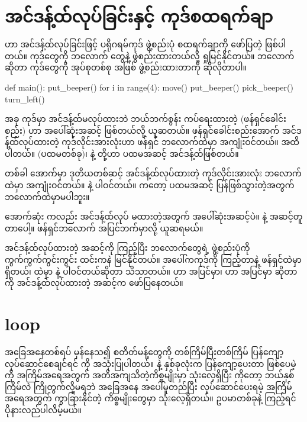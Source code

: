 \section{အင်ဒန့်ထ်လုပ်ခြင်းနှင့် ကုဒ်စထရက်ချာ}

 ဟာ အင်ဒန့်ထ်လုပ်ခြင်းဖြင့် ပရိုဂရမ်ကုဒ် ဖွဲ့စည်းပုံ စထရက်ချာကို ဖော်ပြတဲ့  ဖြစ်ပါတယ်။  ကုဒ်တွေကို ဘလောက်  တွေနဲ့ ဖွဲစည်းထားတယ်လို့ ရှုမြင်နိုင်တယ်။ ဘလောက်ဆိုတာ ကုဒ်တွေကို အုပ်စုတစ်စု အဖြစ် ဖွဲ့စည်းထားတာကို ဆိုလိုတာပါ။ 
%
\begin{py}
def main():
    put_beeper()
    for i in range(4):
        move()
        put_beeper()
    pick_beeper()
turn_left()
\end{py}
%
အခု  ကုဒ်မှာ အင်ဒန့်ထ်မလုပ်ထားဘဲ  ဘယ်ဘက်စွန်း ကပ်ရေးထားတဲ့  (ဖန်ရှင်ခေါင်းစည်း) ဟာ အပေါ်ဆုံးအဆင့်  ဖြစ်တယ်လို့ ယူဆတယ်။ ဖန်ရှင်ခေါင်းစည်းအောက် အင်ဒန့်ထ်လုပ်ထားတဲ့ ကုဒ်လိုင်းအားလုံးဟာ  ဖန်ရှင် ဘလောက်ထဲမှာ အကျုံးဝင်တယ်။  အထိပါတယ်။  (ပထမတစ်ခု)၊   နဲ့  တို့ဟာ ပထမအဆင့် အင်ဒန့်ထ်ဖြစ်တယ်။ 

တစ်ခါ  အောက်မှာ ဒုတိယတစ်ဆင့် အင်ဒန့်ထ်လုပ်ထားတဲ့ ကုဒ်လိုင်းအားလုံး  ဘလောက်ထဲမှာ အကျုံး\allowbreak ဝင်တယ်။  နဲ့  ပါဝင်တယ်။  ကတော့ ပထမအဆင့် ပြန်ဖြစ်သွားတဲ့အတွက်  ဘလောက်ထဲမှာမပါဘူး။ 

အောက်ဆုံး  ကလည်း အင်ဒန့်ထ်လုပ် မထားတဲ့အတွက် အပေါ်ဆုံးအဆင့်ပဲ။  နဲ့ အဆင့်တူတာပေါ့။  ဖန်ရှင်ဘလောက် အပြင်ဘက်မှာလို့ ယူဆရမယ်။ 

အင်ဒန့်ထ်လုပ်ထားတဲ့ အဆင့်ကို ကြည့်ပြီး ဘလောက်တွေရဲ့ ဖွဲ့စည်းပုံကို ကွက်ကွက်ကွင်းကွင်း ထင်းကနဲ မြင်နိုင်တယ်။ အပေါ်ကကုဒ်ကို ကြည့်တာနဲ့  ဖန်ရှင်ထဲမှာ   ရှိတယ်၊   ထဲမှာ  နဲ့  ပါဝင်တယ်ဆိုတာ သိသာတယ်။  ဟာ   အပြင်မှာ၊  ဟာ  အပြင်မှာ ဆိုတာကို အင်ဒန့်ထ်လုပ်ထားတဲ့ အဆင့်က ဖော်ပြနေတယ်။






\section{ loop}
အခြေအနေတစ်ရပ် မှန်နေသ၍ စတိတ်မန့်တွေကို တစ်ကြိမ်ပြီးတစ်ကြိမ် ပြန်ကျော့ လုပ်ဆောင်စေချင်ရင်   ကို အသုံးပြုပါတယ်။   နဲ့   နှစ်ခုလုံးက ပြန်ကျော့ပေးတာ ဖြစ်ပေမဲ့  ကို အကြိမ်အရေအတွက် အတိအကျသိတဲ့ကိစ္စမျိုးမှာ သုံးလေ့ရှိပြီး  ကိုတော့ ဘယ်နှစ်ကြိမ်လဲ ကြိုတွက်လို့မရဘဲ အခြေအနေ အပေါ်မူတည်ပြီး လုပ်ဆောင်ပေးရမဲ့ အကြိမ်အရေအတွက် ကွာခြားနိုင်တဲ့ ကိစ္စမျိုးတွေမှာ သုံးလေ့ရှိတယ်။ ဥပမာတစ်ခုနဲ့ ကြည့်ရင် ပိုနားလည်ပါလိမ့်မယ်။

